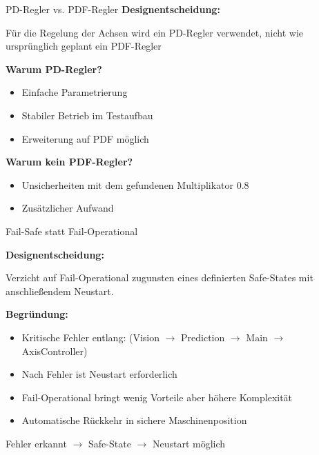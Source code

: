 \documentclass[aspectratio=169]{beamer}
\begin{document}
	\begin{frame}{PD-Regler vs. PDF-Regler}
		\textbf{Designentscheidung:}

		Für die Regelung der Achsen wird ein PD-Regler verwendet, nicht wie ursprünglich geplant ein PDF-Regler

		\vspace{0.5em}

		\textbf{Warum PD-Regler?}
		\begin{itemize}
			\item Einfache Parametrierung
			\item Stabiler Betrieb im Testaufbau
			\item Erweiterung auf PDF möglich
		\end{itemize}

		\vspace{0.8em}

		\textbf{Warum kein PDF-Regler?}

		\begin{itemize}
			\item Unsicherheiten mit dem gefundenen Multiplikator 0.8
			\item Zusätzlicher Aufwand
		\end{itemize}

	\end{frame}
		
	\begin{frame}{Fail-Safe statt Fail-Operational}

	\textbf{Designentscheidung:}

	Verzicht auf Fail-Operational zugunsten eines
	definierten Safe-States mit anschließendem Neustart.

	\vspace{0.5em}

	\textbf{Begründung:}
	\begin{itemize}
		\item Kritische Fehler entlang:
			(Vision $\rightarrow$ Prediction $\rightarrow$ Main $\rightarrow$ AxisController)
		\item Nach Fehler ist Neustart erforderlich
		\item Fail-Operational bringt wenig Vorteile aber höhere Komplexität %
		\item Automatische Rückkehr in sichere Maschinenposition
	\end{itemize}

	\vfill
	\centering
	\Large
	Fehler erkannt $\rightarrow$ Safe-State $\rightarrow$ Neustart möglich

	\end{frame}
\end{document}

